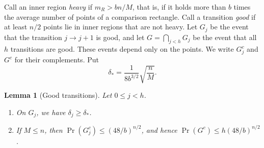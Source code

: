 \documentclass[11pt,letterpaper]{article}
\newtheorem{lemma}[theorem]{Lemma}
\newcommand{\1}{\mathbf{1}}
\begin{document}
Call an inner region \emph{heavy} if $m_R>bn/M$, that is, if it holds more than $b$ times the average number of points of a comparison rectangle. Call a transition \emph{good} if at least $n/2$ points lie in inner regions that are not heavy. Let $G_j$ be the event that the transition $j\to j+1$ is good, and let $G=\bigcap_{j<h}G_j$ be the event that all $h$ transitions are good. These events depend only on the points. We write $G_j^c$ and $G^c$ for their complements. Put
\begin{equation}\label{eq:d}
\delta_*=\frac1{8b^{3/2}}\sqrt{\frac nM}.
\end{equation}

\begin{lemma}[Good transitions]\label{lem:crowd}
Let $0\le j<h$.
\begin{enumerate}[label=(\roman*),nosep]
\item On $G_j$, we have $\delta_j\ge\delta_*$.
\item If $M\le n$, then $\Pr(G_j^c)\le(48/b)^{n/2}$, and hence $\Pr(G^c)\le h(48/b)^{n/2}$.
\end{enumerate}
\end{lemma}
\end{document}
